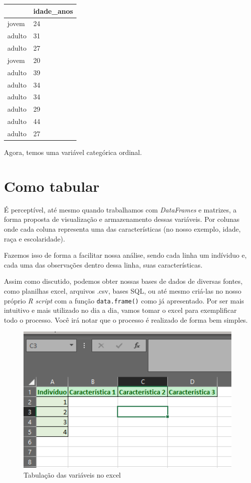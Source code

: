 \documentclass[
  letterpaper,
  DIV=11,
  numbers=noendperiod]{scrreprt}
\begin{document}
\begin{longtable}[]{@{}ll@{}}
\toprule()
& idade\_anos \\
\midrule()
\endhead
jovem & 24 \\
adulto & 31 \\
adulto & 27 \\
jovem & 20 \\
adulto & 39 \\
adulto & 34 \\
adulto & 34 \\
adulto & 29 \\
adulto & 44 \\
adulto & 27 \\
\bottomrule()
\end{longtable}

Agora, temos uma variável categórica ordinal.

\hypertarget{como-tabular}{%
\section{Como tabular}\label{como-tabular}}

É perceptível, até mesmo quando trabalhamos com \emph{DataFrames} e
matrizes, a forma proposta de visualização e armazenamento dessas
variáveis. Por colunas onde cada coluna representa uma das
características (no nosso exemplo, idade, raça e escolaridade).

Fazemos isso de forma a facilitar nossa análise, sendo cada linha um
indíviduo e, cada uma das observações dentro dessa linha, suas
características.

Assim como discutido, podemos obter nossas bases de dados de diversas
fontes, como planilhas excel, arquivos .csv, bases SQL, ou até mesmo
criá-las no nosso próprio \emph{R script} com a função
\texttt{data.frame()} como já apresentado. Por ser mais intuitivo e mais
utilizado no dia a dia, vamos tomar o excel para exemplificar todo o
processo. Você irá notar que o processo é realizado de forma bem
simples.

\begin{figure}

{\centering \includegraphics[width=1\textwidth,height=\textheight]{./figuras_tabulacao/excel1.png}

}

\caption{Tabulação das variáveis no excel}

\end{figure}
\end{document}
